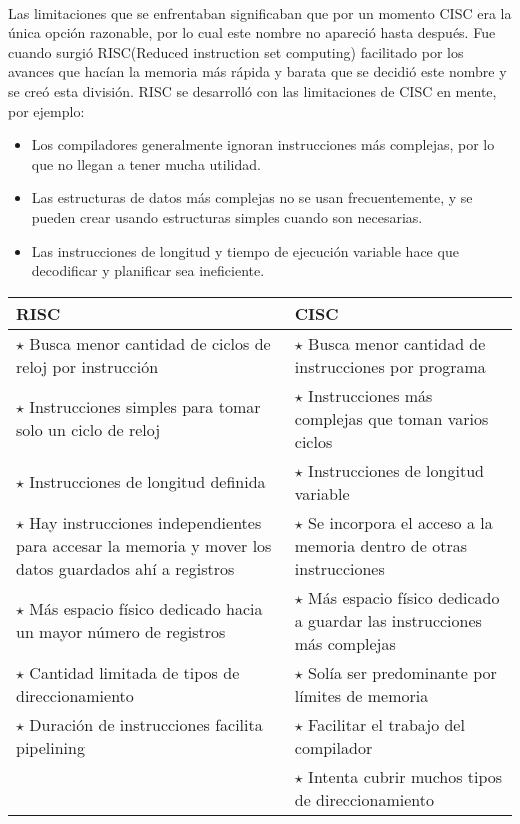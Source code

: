 \documentclass[10pt,a4paper]{article}
\begin{document}
\paragraph{}
Las limitaciones que se enfrentaban significaban que por un momento CISC era la única opción razonable, por lo cual este nombre no apareció hasta después. Fue cuando surgió RISC(Reduced instruction set computing) facilitado por los avances que hacían la memoria más rápida y barata que se decidió este nombre y se creó esta división. RISC se desarrolló con las limitaciones de CISC en mente, por ejemplo:	
\begin{itemize}
\item Los compiladores generalmente ignoran instrucciones más complejas, por 	lo que no llegan a tener mucha utilidad.
\item Las estructuras de datos más complejas no se usan frecuentemente, y se pueden crear usando estructuras simples cuando son necesarias.
\item Las instrucciones de longitud y tiempo de ejecución variable hace que decodificar y planificar sea ineficiente.
\end{itemize}
\begin{center}
\begin{table}
\begin{tabular}{| p{5cm} | p{5cm} |}
\hline
RISC & CISC \\ \hline
$\star$ Busca menor cantidad de ciclos de reloj por instrucción & $\star$ Busca menor cantidad de instrucciones por programa \\
$\star$ Instrucciones simples para tomar solo un ciclo de reloj & $\star$ Instrucciones más complejas que toman varios ciclos \\
$\star$ Instrucciones de longitud definida & $\star$ Instrucciones de longitud variable\\
$\star$ Hay instrucciones independientes para accesar la memoria y mover los datos guardados ahí a registros & $\star$ Se incorpora el acceso a la memoria dentro de otras instrucciones\\
$\star$ Más espacio físico dedicado hacia un mayor número de registros & $\star$ Más espacio físico dedicado a guardar las instrucciones más complejas\\
$\star$ Cantidad limitada de tipos de direccionamiento & $\star$ Solía ser predominante por límites de memoria\\
$\star$ Duración de instrucciones facilita pipelining & $\star$ Facilitar el trabajo del compilador\\
\vphantom{A} & $\star$ Intenta cubrir muchos tipos de direccionamiento\\
\hline
\end{tabular}
\end{table}
\end{center}
\end{document}
